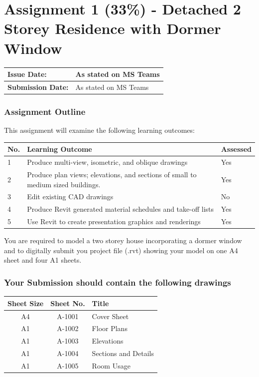 
	
\part*{Assignment 1 (33\%) - Detached 2 Storey Residence with Dormer Window}

\begin{tabularx}{\textwidth}{ |X|X| }
	\hline
	\textbf{Issue Date:} & As stated on MS Teams \\
	\hline 
	\textbf{Submission Date:}  & As stated on MS Teams \\
	\hline
\end{tabularx}


\section*{Assignment Outline}

This assignment will examine the following learning outcomes:

\begin{tabularx}{\textwidth}{ |X|X|X| }
	\hline
	\textbf{No.} & \textbf{Learning Outcome} & \textbf{Assessed} \\
	\hline 
	1  & Produce multi-view, isometric, and oblique drawings & Yes \\
	2  & Produce plan views; elevations, and sections of small to medium sized buildings. & Yes \\
	3  & Edit existing CAD drawings & No \\
	4  & Produce Revit generated material schedules and take-off lists & Yes \\
	5  & Use Revit to create presentation graphics and renderings & Yes \\
	\hline
\end{tabularx}


You are required to model a two storey house incorporating a dormer window and to digitally submit you project file (.rvt) showing your model on one A4 sheet and four A1 sheets.

\section*{Your Submission should contain the following drawings}



\begin{tabularx}{\textwidth}{ |c|c|X| }
	\hline
	\textbf{Sheet Size} & \textbf{Sheet No.} & \textbf{Title} \\
	\hline 
	A4  & A-1001 & Cover Sheet \\
	A1  & A-1002 & Floor Plans \\
	A1  & A-1003 & Elevations \\
	A1  & A-1004 & Sections and Details \\
	A1  & A-1005 & Room Usage \\
	\hline
\end{tabularx}

